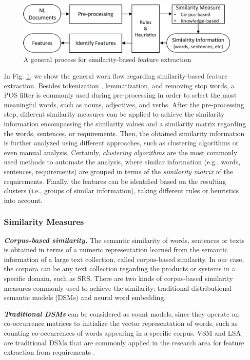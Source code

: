 \documentclass[graybox]{svmult}
\newcommand{\myparagraph}[1]{\noindent\emph{\textbf{#1}}}
\begin{document}
\begin{figure}
\centering
\includegraphics[scale=0.4]{figs/similar_feature.png}
\caption{A general process for similarity-based feature extraction}
\label{fig:similar_feature}
\end{figure}

In Fig. \ref{fig:similar_feature}, we show the general work flow regarding similarity-based feature extraction. Besides tokenization , lemmatization, and removing stop words, a POS filter is commonly used during pre-processing in order to select the most meaningful words, such as nouns, adjectives, and verbs. After the pre-processing step, different similarity measures can be applied to achieve the similarity information encompassing the similarity values and a similarity matrix regarding the words, sentences, or requirements. Then, the obtained similarity information is further analyzed using different approaches, such as clustering algorithms or even manual analysis. Certainly, \textit{clustering algorithms} are the most commonly used methods to automate the analysis, where similar information (e.g., words, sentences, requirements) are grouped in terms of the \textit{similarity matrix} of the requirements. Finally, the features can be identified based on the resulting clusters (i.e., groups of similar information), taking different rules or heuristics into account.

\subsubsection{Similarity Measures}
\textit{\textbf{Corpus-based similarity.}}
The semantic similarity of words, sentences or texts is obtained in terms of a numeric representation learned from the semantic information of a large text collection, called corpus-based similarity. In our case, the corpora can be any text collection regarding the products or systems in a specific domain, such as SRS. There are two kinds of corpus-based similarity measures commonly used to achieve the similarity: traditional distributional semantic models (DSMs) and neural word embedding.

\myparagraph{Traditional DSMs} can be considered as count models, since they operate on co-occurrence matrices to initialize the vector representation of words, such as counting co-occurrences of words appearing in a specific corpus. VSM and LSA are traditional DSMs that are commonly applied in the research area for feature extraction from requirements \cite{KumakiTWF12,AlvesSBRSRPR08,WestonCR09}.
\end{document}
